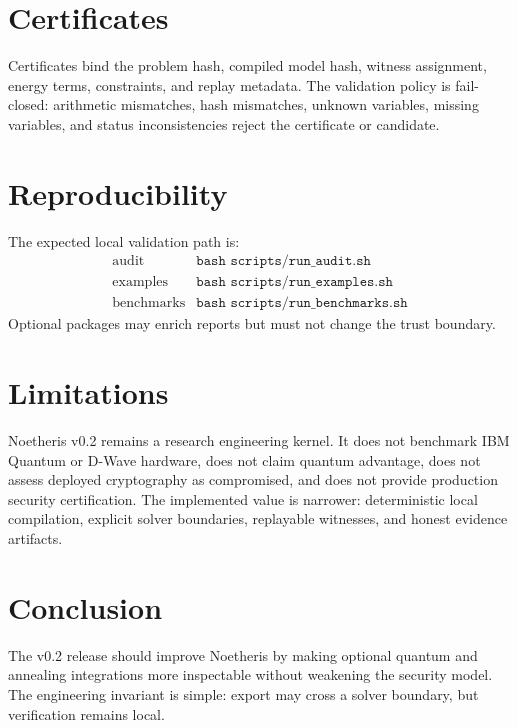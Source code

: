 \documentclass[11pt]{article}
\begin{document}
\section{Certificates}

Certificates bind the problem hash, compiled model hash, witness assignment,
energy terms, constraints, and replay metadata. The validation policy is
fail-closed: arithmetic mismatches, hash mismatches, unknown variables, missing
variables, and status inconsistencies reject the certificate or candidate.

\section{Reproducibility}

The expected local validation path is:
\[
\begin{array}{ll}
\text{audit} & \texttt{bash scripts/run\_audit.sh} \\
\text{examples} & \texttt{bash scripts/run\_examples.sh} \\
\text{benchmarks} & \texttt{bash scripts/run\_benchmarks.sh}
\end{array}
\]
Optional packages may enrich reports but must not change the trust boundary.

\section{Limitations}

Noetheris v0.2 remains a research engineering kernel. It does not benchmark
IBM Quantum or D-Wave hardware, does not claim quantum advantage, does not
assess deployed cryptography as compromised, and does not provide production
security certification. The implemented value is narrower: deterministic local
compilation, explicit solver boundaries, replayable witnesses, and honest
evidence artifacts.

\section{Conclusion}

The v0.2 release should improve Noetheris by making optional quantum and
annealing integrations more inspectable without weakening the security model.
The engineering invariant is simple: export may cross a solver boundary, but
verification remains local.
\end{document}
